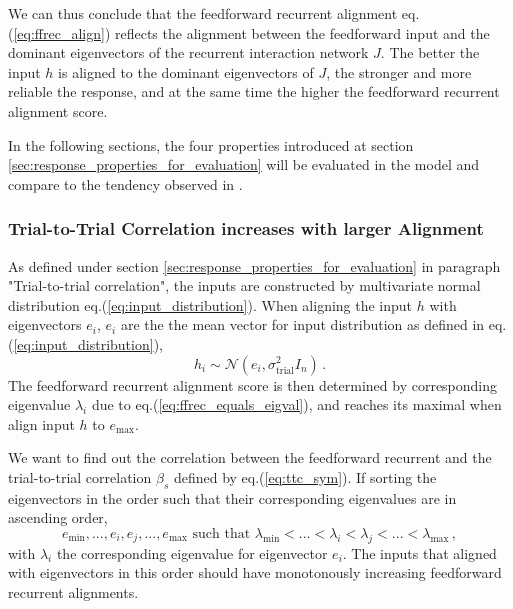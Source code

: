 \documentclass[11pt]{article}
\begin{document}
	We can thus conclude that the feedforward recurrent alignment eq.(\ref{eq:ffrec_align}) reflects the alignment between the feedforward input and the dominant eigenvectors of the recurrent interaction network $J$. The better the input $h$ is aligned to the dominant eigenvectors of $J$, the stronger and more reliable the response, and at the same time the higher the feedforward recurrent alignment score.
	
	In the following sections, the four properties introduced at section \ref{sec:response_properties_for_evaluation} will be evaluated in the model and compare to the tendency observed in \cite{tragenap2023nature}. 
	
	\subsubsection{Trial-to-Trial Correlation increases with larger Alignment}
	
	As defined under section \ref{sec:response_properties_for_evaluation} in paragraph "Trial-to-trial correlation", the inputs are constructed by multivariate normal distribution eq.(\ref{eq:input_distribution}). When aligning the input $h$ with eigenvectors $e_i$, $e_i$ are the the mean vector for input distribution as defined in eq.(\ref{eq:input_distribution}), 
		\begin{equation}
			h_i \sim \mathcal{N} (e_i, \sigma_{\text{trial}}^2 I_n) \, . 
		\end{equation}
	The feedforward recurrent alignment score is then determined by corresponding eigenvalue $\lambda_i$ due to eq.(\ref{eq:ffrec_equals_eigval}), and reaches its maximal when align input $h$ to $e_{\text{max}}$. 
	
	
	We want to find out the correlation between the feedforward recurrent and the trial-to-trial correlation $\beta_s$ defined by eq.(\ref{eq:ttc_sym}). If sorting the eigenvectors in the order such that their corresponding eigenvalues are in ascending order, 
		\begin{equation} \label{eq:ascending_order}
			e_{\text{min}}, ..., e_i, e_j, ..., e_{\text{max}} \, \, \text{such that} \, \, \lambda_{\text{min}} < ...< \lambda_i < \lambda_j < ... < \lambda_{\text{max}} \, ,
		\end{equation}
	with $\lambda_i$ the corresponding eigenvalue for eigenvector $e_i$. The inputs that aligned with eigenvectors in this order should have monotonously increasing feedforward recurrent alignments.
	
\end{document}
